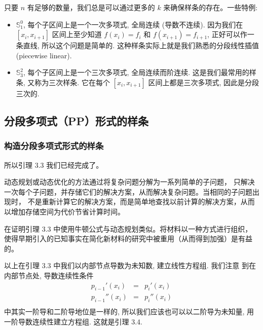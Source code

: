 \documentclass[a4paper]{ctexart}
\begin{document}
{只要 $n$ 有足够的数量，我们总是可以通过更多的 $k$ 来确保样条的存在。一些特例:

\begin{itemize}
  \item $\mathbb{S}_1^0$, 每个子区间上是一个一次多项式, 全局连续 (导数不连续). 
  因为我们在 $[x_i, x_{i + 1}]$ 区间上至少知道 $f(x_i) = f_i$ 和 
  $f(x_{i + 1}) = f_{i + 1}$, 正好可以作一条直线, 所以这个问题是简单的. 
  这种样条实际上就是我们熟悉的分段线性插值 (piecewise linear). 
  \item $\mathbb{S}_3^2$, 每个子区间上是一个三次多项式, 全局连续而阶连续. 
  这是我们最常用的样条, 又称为三次样条. 它在每个 $[x_i, x_{i + 1}]$ 
  区间上都是三次多项式, 因此是分段三次的. 
\end{itemize}

\subsection{分段多项式（PP）形式的样条}
\subsubsection{构造分段多项式形式的样条}

所以引理 3.3 我们已经完成了。


 动态规划或动态优化的方法通过将复杂问题分解为一系列简单的子问题，
只解决一次每个子问题，并存储它们的解决方案，从而解决复杂问题。当相同的子问题出现时，
不是重新计算它的解决方案，而是简单地查找以前计算的解决方案，从而以增加存储空间为代价节省计算时间。

在证明引理 3.3 中使用牛顿公式与动态规划类似。将材料以一种方式进行组织，
使得早期引入的已知事实在简化新材料的研究中被重用（从而得到加强）是有益的。

以上在引理 3.3 中我们以内部节点导数为未知数, 建立线性方程组. 我们注意
到在内部节点处, 导数连续性条件
$$
\begin{array}{rcl}
  p_{i - 1}'(x_i) &=& p_i'(x_i) \\
  p_{i - 1}''(x_i) &=& p_i''(x_i) \\
\end{array}
$$
中其实一阶导和二阶导地位是一样的, 所以我们应该也可以以二阶导为未知量,
用一阶导数连续性建立方程组. 这就是引理 3.4. 

}
\end{document}
